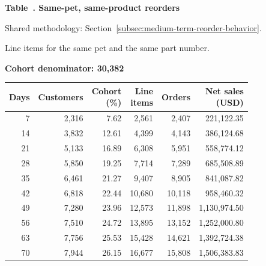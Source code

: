 \label{tab:financial-opportunity-reorder-windows}
\par\smallskip\noindent\parbox[t][2\baselineskip][t]{\linewidth}{\raggedright\textbf{Table~\thetable. Same-pet, same-product reorders}}
\par\raggedright\footnotesize Shared methodology: Section~\ref{subsec:medium-term-reorder-behavior}.
\par\noindent\parbox[t][2\baselineskip][t]{\linewidth}{\raggedright Line items for the same pet and the same part number.}
\par\noindent\textbf{Cohort denominator: 30,382}
\par\centering\footnotesize
\setlength{\tabcolsep}{2pt}
\begin{tabular}{rrrrrr}\toprule
Days & Customers & \shortstack{Cohort\\(\%)} & \shortstack{Line\\items} & Orders & \shortstack{Net sales\\(USD)} \\ \midrule
7 & 2,316 & 7.62 & 2,561 & 2,407 & 221,122.35 \\
14 & 3,832 & 12.61 & 4,399 & 4,143 & 386,124.68 \\
21 & 5,133 & 16.89 & 6,308 & 5,951 & 558,774.12 \\
28 & 5,850 & 19.25 & 7,714 & 7,289 & 685,508.89 \\
35 & 6,461 & 21.27 & 9,407 & 8,905 & 841,087.82 \\
42 & 6,818 & 22.44 & 10,680 & 10,118 & 958,460.32 \\
49 & 7,280 & 23.96 & 12,573 & 11,898 & 1,130,974.50 \\
56 & 7,510 & 24.72 & 13,895 & 13,152 & 1,252,000.80 \\
63 & 7,756 & 25.53 & 15,428 & 14,621 & 1,392,724.38 \\
70 & 7,944 & 26.15 & 16,677 & 15,808 & 1,506,383.83 \\
\bottomrule\end{tabular}\par
